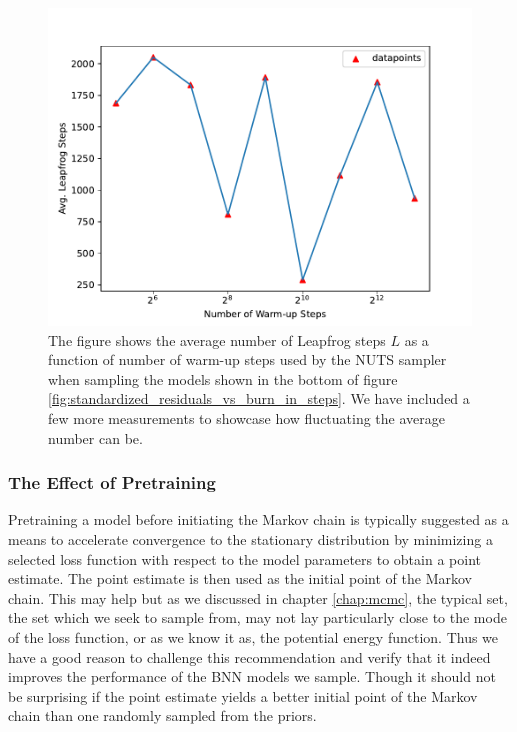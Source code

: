 \begin{figure}[h!]
    \centering
    \includegraphics[scale=0.7]{figures/standardized_residuals/effect_of_burnin/avg_burnin_steps_nuts_vs_burn_in_steps.pdf}
    \caption{The figure shows the average number of Leapfrog steps $L$ as a function of number of warm-up steps used by the NUTS sampler when sampling the models shown in the bottom of figure \ref{fig:standardized_residuals_vs_burn_in_steps}. We have included a few more measurements to showcase how fluctuating the average number can be. 
    }
    \label{fig:avg_leapfrog_steps_vs_burn_in}
\end{figure}




\subsubsection{The Effect of Pretraining}
Pretraining a model before initiating the Markov chain is typically suggested as a means to accelerate convergence to the stationary distribution by minimizing a selected loss function with respect to the model parameters to obtain a point estimate. The point estimate is then used as the initial point of the Markov chain. This may help but as we discussed in chapter \ref{chap:mcmc}, the typical set, the set which we seek to sample from, may not lay particularly close to the mode of the loss function, or as we know it as, the potential energy function. Thus we have a good reason to challenge this recommendation and verify that it indeed improves the performance of the BNN models we sample. Though it should not be surprising if the point estimate yields a better initial point of the Markov chain than one randomly sampled from the priors.

